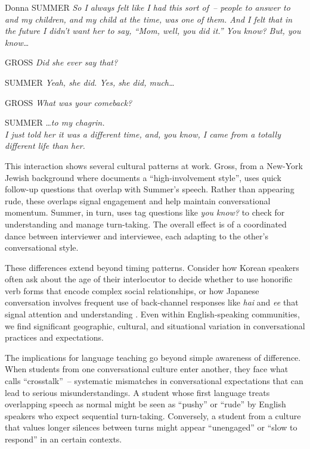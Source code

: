 \ea
\begin{dialogue}
\item[Donna SUMMER] \textit{So I always felt like I had this sort of~-- people to answer to and my children, and my child at the time, was one of them. And I felt that in the future I didn't want her to say, ``Mom, well, you did it.'' You know? But, you know\dots} 
\item[GROSS] \phantom{~~~~~~~~~~~}\textit{Did she ever say that?} 
\item[SUMMER] \textit{Yeah, she did. Yes, she did, much\dots}
\item[GROSS] \phantom{~~~~~~~~~~~~~~~~~~~~~~}\textit{What was your comeback?} 
\item[SUMMER] \phantom{Yeah, she did. Yes, she did, much}\dots\textit{to my chagrin.\\I just told her it was a different time, and, you know, I came from a totally different life than her.}
\end{dialogue}
\z

This interaction shows several cultural patterns at work. Gross, from a New-York Jewish background where \citet{tannen1984} documents a ``high-involvement style'', uses quick follow-up questions that overlap with Summer's speech. Rather than appearing rude, these overlaps signal engagement and help maintain conversational momentum. Summer, in turn, uses tag questions like \textit{you know?} to check for understanding and manage turn-taking. The overall effect is of a coordinated dance between interviewer and interviewee, each adapting to the other's conversational style.

These differences extend beyond timing patterns. Consider how Korean speakers often ask about the age of their interlocutor to decide whether to use honorific verb forms that encode complex social relationships, or how Japanese conversation involves frequent use of back-channel responses like \textit{hai} and \textit{ee} that signal attention and understanding \citep{maynard1986}. Even within English-speaking communities, we find significant geographic, cultural, and situational variation in conversational practices and expectations.

The implications for language teaching go beyond simple awareness of difference. When students from one conversational culture enter another, they face what \citet{gumperz1982} calls ``crosstalk''~-- systematic mismatches in conversational expectations that can lead to serious misunderstandings. A student whose first language treats overlapping speech as normal might be seen as ``pushy'' or ``rude'' by English speakers who expect sequential turn-taking. Conversely, a student from a culture that values longer silences between turns might appear ``unengaged'' or ``slow to respond'' in an certain contexts.

